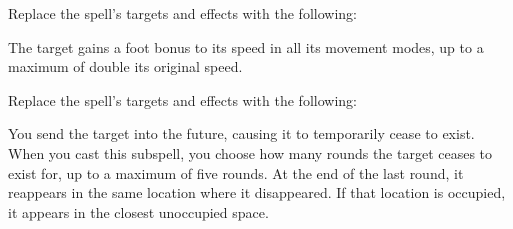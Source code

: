 


Replace the spell's targets and effects with the following:
\begin{spellcontent}

\begin{augmenttargetinginfo}



\end{augmenttargetinginfo}


\begin{augmenteffects}



\spelleffect
The target gains a  foot bonus to its speed in all its movement modes, up to a maximum of double its original speed.








\end{augmenteffects}

\end{spellcontent}








Replace the spell's targets and effects with the following:
\begin{spellcontent}

\begin{augmenttargetinginfo}



\end{augmenttargetinginfo}


\begin{augmenteffects}



\spelleffect
You send the target into the future, causing it to temporarily cease to exist.
When you cast this subspell, you choose how many rounds the target ceases to exist for, up to a maximum of five rounds.
At the end of the last round, it reappears in the same location where it disappeared.
If that location is occupied, it appears in the closest unoccupied space.








\end{augmenteffects}

\end{spellcontent}






